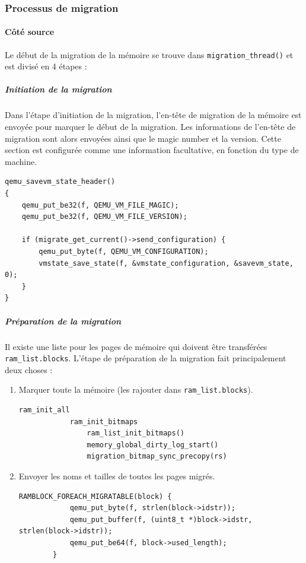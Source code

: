 \subsubsection{Processus de migration}

\paragraph*{Côté source}
Le début de la migration de la mémoire se trouve dans \texttt{migration\_thread()} et est divisé en 4 étapes : 

\subparagraph*{Initiation de la migration}
Dans l'étape d'initiation de la migration, l'en-tête de migration de la mémoire est envoyée pour marquer le début de la migration.
Les informations de l'en-tête de migration sont alors envoyées ainsi que le magic number et la version.
Cette section est configurée comme une information facultative, en fonction du type de machine.
\begin{lstlisting}[caption={Code responsable de la phase d'initiation},captionpos=b]
qemu_savevm_state_header()
{       
    qemu_put_be32(f, QEMU_VM_FILE_MAGIC);
    qemu_put_be32(f, QEMU_VM_FILE_VERSION);
            
    if (migrate_get_current()->send_configuration) {
        qemu_put_byte(f, QEMU_VM_CONFIGURATION);
        vmstate_save_state(f, &vmstate_configuration, &savevm_state, 0);
    }       
} 
\end{lstlisting}

\subparagraph*{Préparation de la migration}
Il existe une liste pour les pages de mémoire qui doivent être transférées \texttt{ram\_list.blocks}. 
L'étape de préparation de la migration fait principalement deux choses :
\begin{enumerate}
    \item Marquer toute la mémoire (les rajouter dans \texttt{ram\_list.blocks}).
    \begin{lstlisting}[caption={Différentes fonctions d'initialisation de la bitmap},captionpos=b]
        ram_init_all
            ram_init_bitmaps
                ram_list_init_bitmaps()
                memory_global_dirty_log_start()
                migration_bitmap_sync_precopy(rs)
    \end{lstlisting}

    \item Envoyer les noms et tailles de toutes les pages migrés.
    \begin{lstlisting}[caption={Code responsable de l'envoie des nom et tailles des pages migrés},captionpos=b]
        RAMBLOCK_FOREACH_MIGRATABLE(block) {
            qemu_put_byte(f, strlen(block->idstr));
            qemu_put_buffer(f, (uint8_t *)block->idstr, strlen(block->idstr));
            qemu_put_be64(f, block->used_length);
        }
    \end{lstlisting}
\end{enumerate}

